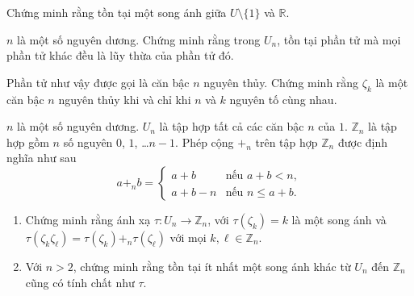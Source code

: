 \begin{exercise}
    Chứng minh rằng tồn tại một song ánh giữa $U\setminus\{ 1 \}$ và $\mathbb{R}$.
\end{exercise}

\begin{exercise}
	$n$ là một số nguyên dương. Chứng minh rằng trong $U_{n}$, tồn tại phần tử mà mọi phần tử khác đều là lũy thừa của phần tử đó.

	Phần tử như vậy được gọi là căn bậc $n$ nguyên thủy. Chứng minh rằng $\zeta_{k}$ là một căn bậc $n$ nguyên thủy khi và chỉ khi $n$ và $k$ nguyên tố cùng nhau.
\end{exercise}

\begin{exercise}
    $n$ là một số nguyên dương. $U_{n}$ là tập hợp tất cả các căn bậc $n$ của $1$. $\mathbb{Z}_{n}$ là tập hợp gồm $n$ số nguyên $0$, $1$, \ldots $n-1$. Phép cộng $+_{n}$ trên tập hợp $\mathbb{Z}_{n}$ được định nghĩa như sau
	\[
		a +_{n} b = \begin{cases}
			a + b     & \text{nếu $a + b < n$},   \\
			a + b - n & \text{nếu $n\leq a + b$}.
		\end{cases}
	\]

    \begin{enumerate}[label={(\roman*)}]
        \item Chứng minh rằng ánh xạ $\tau: U_{n}\to \mathbb{Z}_{n}$, với $\tau(\zeta_{k}) = k$ là một song ánh và $\tau(\zeta_{k}\zeta_{\ell}) = \tau(\zeta_{k}) +_{n} \tau(\zeta_{\ell})$ với mọi $k, \ell\in \mathbb{Z}_{n}$.
        \item Với $n > 2$, chứng minh rằng tồn tại ít nhất một song ánh khác từ $U_{n}$ đến $\mathbb{Z}_{n}$ cũng có tính chất như $\tau$.
    \end{enumerate}
\end{exercise}

